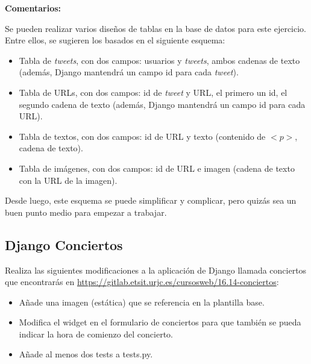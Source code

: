 \textbf{Comentarios:}

Se pueden realizar varios diseños de tablas en la base de datos para este ejercicio. Entre ellos, se sugieren los basados en el siguiente esquema:

\begin{itemize}
\item Tabla de \emph{tweets}, con dos campos: usuarios y \emph{tweets}, ambos cadenas de texto (además, Django mantendrá un campo id para cada \emph{tweet}).
\item Tabla de URLs, con dos campos: id de \emph{tweet} y URL, el primero un id, el segundo cadena de texto (además, Django mantendrá un campo id para cada URL).
\item Tabla de textos, con dos campos: id de URL y texto (contenido de $<p>$, cadena de texto).
\item Tabla de imágenes, con dos campos: id de URL e imagen (cadena de texto con la URL de la imagen).
\end{itemize}

Desde luego, este esquema se puede simplificar y complicar, pero quizás sea un buen punto medio para empezar a trabajar.

\subsection{Django Conciertos}
\label{subsec:django-conciertos}

Realiza las siguientes modificaciones a la aplicación de Django llamada conciertos que encontrarás en \url{https://gitlab.etsit.urjc.es/cursosweb/16.14-conciertos}:

\begin{itemize}
  \item Añade una imagen (estática) que se referencia en la plantilla base.
  \item Modifica el widget en el formulario de conciertos para que también se pueda indicar la hora de comienzo del concierto.
  \item Añade al menos dos tests a tests.py.
\end{itemize}

